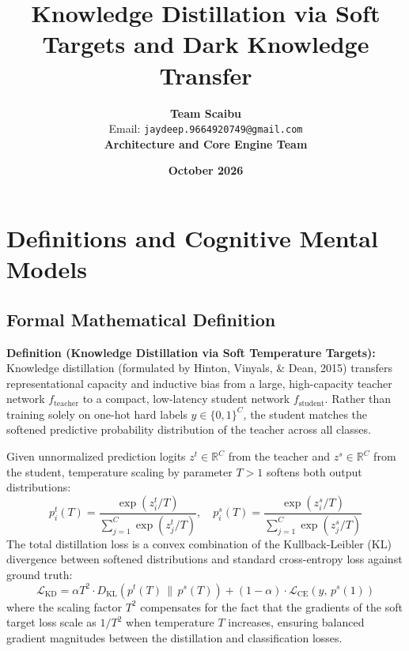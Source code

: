 \documentclass[11pt,a4paper]{article}
\title{\textbf{Knowledge Distillation via Soft Targets and Dark Knowledge Transfer}}
\author{\textbf{Team Scaibu} \\ \small Email: \texttt{jaydeep.9664920749@gmail.com} \\ \small \textbf{Architecture and Core Engine Team}}
\date{\textbf{October 2026}}
\theoremstyle{definition}
\begin{document}
\maketitle

\section{Definitions and Cognitive Mental Models}

\subsection{Formal Mathematical Definition}
\textbf{Definition (Knowledge Distillation via Soft Temperature Targets):}
Knowledge distillation (formulated by Hinton, Vinyals, \& Dean, 2015) transfers representational capacity and inductive bias from a large, high-capacity teacher network $f_{\text{teacher}}$ to a compact, low-latency student network $f_{\text{student}}$. Rather than training solely on one-hot hard labels $y \in \{0, 1\}^C$, the student matches the softened predictive probability distribution of the teacher across all classes.

Given unnormalized prediction logits $z^t \in \mathbb{R}^C$ from the teacher and $z^s \in \mathbb{R}^C$ from the student, temperature scaling by parameter $T > 1$ softens both output distributions:
{\boldmath
\begin{equation}
p_i^t(T) = \frac{\exp(z_i^t / T)}{\sum_{j=1}^C \exp(z_j^t / T)}, \quad p_i^s(T) = \frac{\exp(z_i^s / T)}{\sum_{j=1}^C \exp(z_j^s / T)}
\end{equation}
}
The total distillation loss is a convex combination of the Kullback-Leibler (KL) divergence between softened distributions and standard cross-entropy loss against ground truth:
{\boldmath
\begin{equation}
\mathcal{L}_{\text{KD}} = \alpha T^2 \cdot D_{\text{KL}}\left( p^t(T) \,\|\, p^s(T) \right) + (1 - \alpha) \cdot \mathcal{L}_{\text{CE}}\left( y, \, p^s(1) \right)
\end{equation}
}
where the scaling factor $T^2$ compensates for the fact that the gradients of the soft target loss scale as $1/T^2$ when temperature $T$ increases, ensuring balanced gradient magnitudes between the distillation and classification losses.
\end{document}
